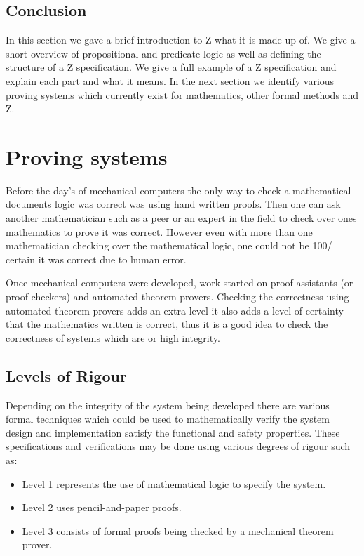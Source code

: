 \subsection{Conclusion}

In this section we gave a brief introduction to Z what it is made up of. We give
a short overview of propositional and predicate logic as well as defining the
structure of a Z specification. We give a full example of a Z specification and
explain each part and what it means. In the next section we identify various
proving systems which currently exist for mathematics, other formal methods and
Z.

\section{Proving systems}

Before the day's of mechanical computers the only way to check a mathematical
documents logic was correct was using hand written proofs. Then one can ask
another mathematician such as a peer or an expert in the field to check over
ones mathematics to prove it was correct. However even with more than one
mathematician checking over the mathematical logic, one could not be 100/%
certain it was correct due to human error. 

Once mechanical computers were developed, work started on proof assistants (or
proof checkers) and automated theorem provers. Checking the correctness using
automated theorem provers adds an extra level it also adds a level of certainty
that the mathematics written is correct, thus it is a good idea to check the
correctness of systems which are or high integrity.

\subsection{Levels of Rigour}

Depending on the integrity of the system being developed there are various
formal techniques which could be used to mathematically verify the system design
and implementation satisfy the functional and safety properties. These
specifications and verifications may be done using various degrees of rigour
such as:

\begin{itemize}
\item Level 1 represents the use of mathematical logic to specify the system.
\item Level 2 uses pencil-and-paper proofs.
\item Level 3 consists of formal proofs being checked by a mechanical theorem
prover.
\end{itemize}

